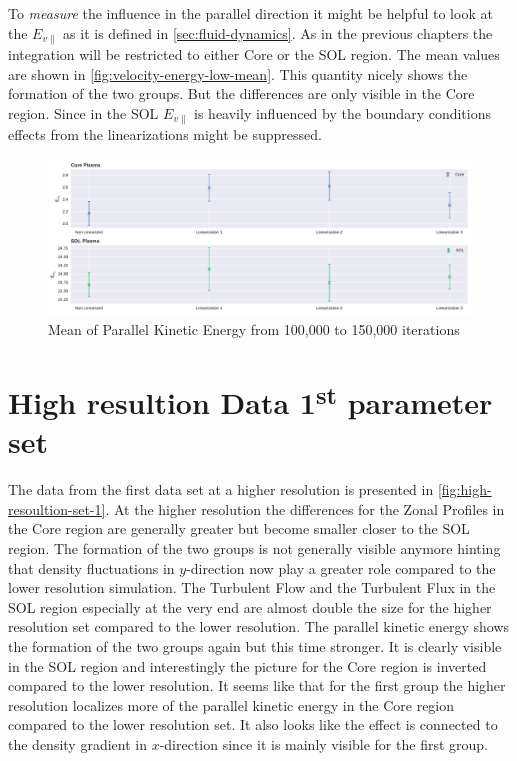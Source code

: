 \documentclass[master.tex]{subfiles}
\begin{document}
To \textit{measure} the influence in the parallel direction it might be helpful to look at the $E_{v\parallel}$ as it is defined in \autoref{sec:fluid-dynamics}.\newline
As in the previous chapters the integration will be restricted to either Core or the \ac{SOL} region. The mean values are shown in \autoref{fig:velocity-energy-low-mean}. This quantity nicely shows the formation of the two groups. But the differences are only visible in the Core region. Since in the \ac{SOL} $E_{v\parallel}$ is heavily influenced by the boundary conditions effects from the linearizations might be suppressed.

\begin{figure}[!htbp]
    \includegraphics[width=\linewidth]{pdfs/velocity-energy-low-means.pdf}
    \caption{Mean of Parallel Kinetic Energy from 100,000 to 150,000 iterations}
    \label{fig:velocity-energy-low-mean}
\end{figure}


\section{High resultion Data 1\textsuperscript{st} parameter set}
The data from the first data set at a higher resolution is presented in \autoref{fig:high-resoultion-set-1}. At the higher resolution the differences for the Zonal Profiles in the Core region are generally greater but become smaller closer to the \ac{SOL} region. The formation of the two groups is not generally visible anymore hinting that density fluctuations in $y$-direction now play a greater role compared to the lower resolution simulation. The Turbulent Flow and the Turbulent Flux in the \ac{SOL} region especially at the very end are almost double the size for the higher resolution set compared to the lower resolution. The parallel kinetic energy shows the formation of the two groups again but this time stronger. It is clearly visible in the \ac{SOL} region and interestingly the picture for the Core region is inverted compared to the lower resolution. It seems like that for the first group the higher resolution localizes more of the parallel kinetic energy in the Core region compared to the lower resolution set. It also looks like the effect is connected to the density gradient in $x$-direction since it is mainly visible for the first group.
\end{document}

